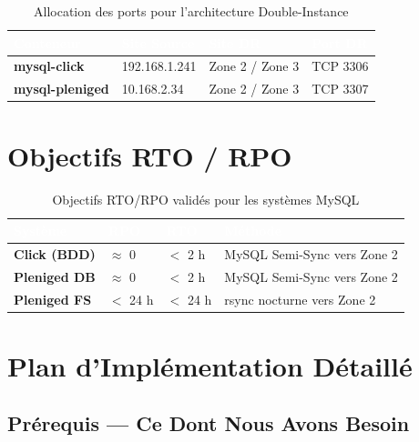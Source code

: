 \documentclass[a4paper,11pt]{article}
\begin{document}
\begin{table}[h!]
\centering
\renewcommand{\arraystretch}{1.4}
\begin{tabular}{|>{\bfseries}l|l|l|l|}
\hline
\rowcolor{bnmblue}\textcolor{white}{Conteneur} & \textcolor{white}{Site Source} & \textcolor{white}{Site DR} & \textcolor{white}{Port DR} \\
\hline
mysql-click & 192.168.1.241 & Zone 2 / Zone 3 & TCP 3306 \\
\hline
\rowcolor{bnmlightgray}
mysql-pleniged & 10.168.2.34 & Zone 2 / Zone 3 & TCP 3307 \\
\hline
\end{tabular}
\caption{Allocation des ports pour l'architecture Double-Instance}
\end{table}

\section{Objectifs RTO / RPO}

\begin{table}[h!]
\centering
\renewcommand{\arraystretch}{1.4}
\begin{tabular}{|>{\bfseries}l|l|l|l|}
\hline
\rowcolor{bnmblue}\textcolor{white}{Système} & \textcolor{white}{RPO} & \textcolor{white}{RTO} & \textcolor{white}{Méthode} \\
\hline
Click (BDD) & $\approx$ 0 & $<$ 2 h & MySQL Semi-Sync vers Zone 2 \\
\hline
\rowcolor{bnmlightgray}
Pleniged DB & $\approx$ 0 & $<$ 2 h & MySQL Semi-Sync vers Zone 2 \\
\hline
Pleniged FS & $<$ 24 h & $<$ 24 h & rsync nocturne vers Zone 2 \\
\hline
\end{tabular}
\caption{Objectifs RTO/RPO validés pour les systèmes MySQL}
\end{table}

\section{Plan d'Implémentation Détaillé}

\subsection{Prérequis — Ce Dont Nous Avons Besoin}
\end{document}
